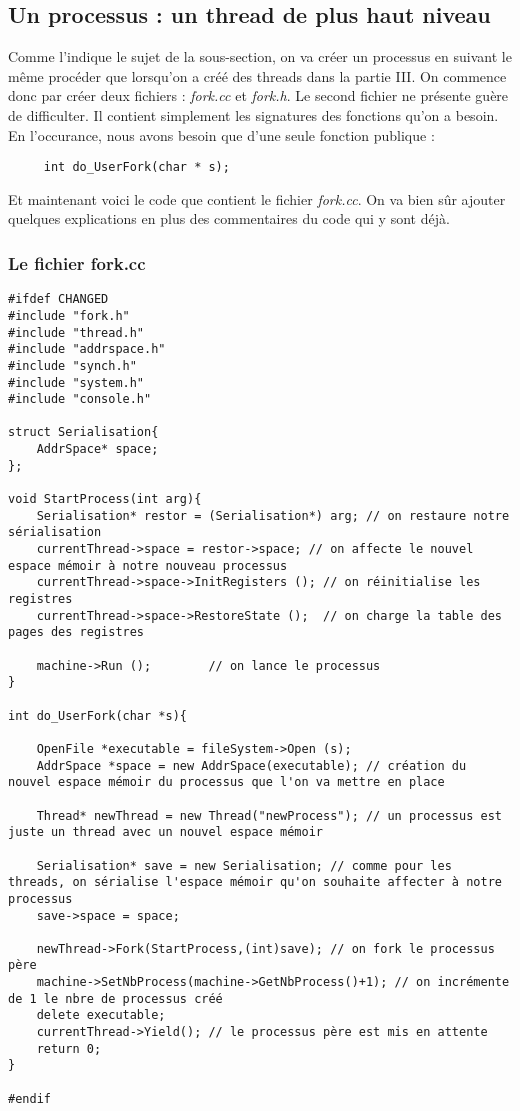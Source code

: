 \documentclass[a4paper,10pt]{report}
\begin{document}
  \newpage
    \textcolor{NavyBlue}{\subsection{Un processus : un thread de plus haut niveau}}
    Comme l'indique le sujet de la sous-section, on va créer un processus en suivant le même procéder que lorsqu'on a créé des threads dans la partie III.
    On commence donc par créer deux fichiers : \emph{fork.cc} et \emph{fork.h}. Le second fichier ne présente guère de difficulter. Il contient simplement
    les signatures des fonctions qu'on a besoin. En l'occurance, nous avons besoin que d'une seule fonction publique :
    \begin{lstlisting}
     int do_UserFork(char * s);
    \end{lstlisting}
    Et maintenant voici le code que contient le fichier \emph{fork.cc}. On va bien sûr ajouter quelques explications en plus des commentaires du code qui 
    y sont déjà.
    \textcolor{TealBlue}{\subsubsection*{Le fichier fork.cc}}
    \begin{lstlisting}
#ifdef CHANGED
#include "fork.h"
#include "thread.h"
#include "addrspace.h"
#include "synch.h"
#include "system.h"
#include "console.h"

struct Serialisation{
	AddrSpace* space;
};

void StartProcess(int arg){
	Serialisation* restor = (Serialisation*) arg; // on restaure notre sérialisation 
	currentThread->space = restor->space; // on affecte le nouvel espace mémoir à notre nouveau processus
	currentThread->space->InitRegisters ();	// on réinitialise les registres
	currentThread->space->RestoreState ();	// on charge la table des pages des registres

	machine->Run ();		// on lance le processus
}

int do_UserFork(char *s){

	OpenFile *executable = fileSystem->Open (s);
	AddrSpace *space = new AddrSpace(executable); // création du nouvel espace mémoir du processus que l'on va mettre en place

	Thread* newThread = new Thread("newProcess"); // un processus est juste un thread avec un nouvel espace mémoir
  
	Serialisation* save = new Serialisation; // comme pour les threads, on sérialise l'espace mémoir qu'on souhaite affecter à notre processus
	save->space = space;

	newThread->Fork(StartProcess,(int)save); // on fork le processus père
	machine->SetNbProcess(machine->GetNbProcess()+1); // on incrémente de 1 le nbre de processus créé
	delete executable;
	currentThread->Yield(); // le processus père est mis en attente
	return 0;
}

#endif 

    \end{lstlisting}
\end{document}
